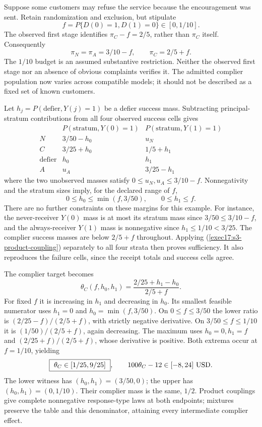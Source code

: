 Suppose some customers may refuse the service because the encouragement
was sent. Retain randomization and exclusion, but stipulate
\[
 f=P\{D(0)=1,D(1)=0\}\in[0,1/10].
\]
The observed first stage identifies $\pi_C-f=2/5$, rather than
$\pi_C$ itself. Consequently
\[
 \pi_N=\pi_A=3/10-f,\qquad \pi_C=2/5+f.
\]
The $1/10$ budget is an assumed substantive restriction. Neither the
observed first stage nor an absence of obvious complaints verifies it.
The admitted complier population now varies across compatible models;
it should not be described as a fixed set of known customers.

Let $h_j=P(\text{defier},Y(j)=1)$ be a defier success mass. Subtracting
principal-stratum contributions from all four observed success cells gives
\[
\begin{array}{c|cc}
 &P(\text{stratum},Y(0)=1)&P(\text{stratum},Y(1)=1)\\ \hline
 N&3/50-h_0&u_N\\
 C&3/25+h_0&1/5+h_1\\
 \text{defier}&h_0&h_1\\
 A&u_A&3/25-h_1
\end{array}
\]
where the two unobserved masses satisfy
$0\leq u_N,u_A\leq3/10-f$. Nonnegativity and the stratum sizes imply,
for the declared range of $f$,
\begin{equation}
 0\leq h_0\leq\min(f,3/50),\qquad 0\leq h_1\leq f .
 \label{exec17:s3-defier-feasible}
\end{equation}
There are no further constraints on these margins for this example.
For instance, the never-receiver $Y(0)$ mass is at most its stratum
mass since $3/50\leq3/10-f$, and the always-receiver $Y(1)$ mass
is nonnegative since $h_1\leq1/10<3/25$.
The complier success masses are below $2/5+f$ throughout.
Applying (\ref{exec17:s3-product-coupling}) separately to all four
strata then proves sufficiency. It also reproduces the failure cells,
since the receipt totals and success cells agree.

The complier target becomes
\begin{equation}
 \theta_C(f,h_0,h_1)
 =\frac{2/25+h_1-h_0}{2/5+f}.
 \label{exec17:s3-defier-ratio}
\end{equation}
For fixed $f$ it is increasing in $h_1$ and decreasing in $h_0$.
Its smallest feasible numerator uses $h_1=0$ and
$h_0=\min(f,3/50)$. On $0\leq f\leq3/50$ the lower ratio is
$(2/25-f)/(2/5+f)$, with strictly negative derivative.
On $3/50\leq f\leq1/10$ it is
$(1/50)/(2/5+f)$, again decreasing.
The maximum uses $h_0=0,h_1=f$ and
$(2/25+f)/(2/5+f)$, whose derivative is positive.
Both extrema occur at $f=1/10$, yielding
\begin{equation}
 \boxed{\ \theta_C\in[1/25,9/25]\ },\qquad
 100\theta_C-12\in[-8,24]\ {\rm USD}.
 \label{exec17:s3-defier-sharp}
\end{equation}
The lower witness has $(h_0,h_1)=(3/50,0)$; the upper has
$(h_0,h_1)=(0,1/10)$. Their complier mass is the same, $1/2$.
Product couplings give complete nonnegative response-type laws at both
endpoints; mixtures preserve the table and this denominator, attaining
every intermediate complier effect.

